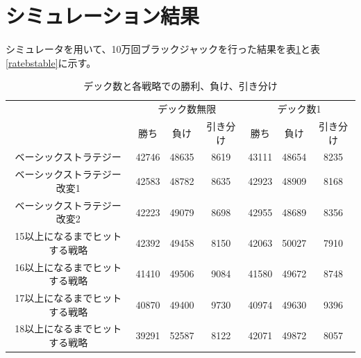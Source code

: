 \section{シミュレーション結果}
シミュレータを用いて、10万回ブラックジャックを行った結果を表\ref{bstable}と表\ref{ratebstable}に示す。
\begin{table}[H]
 \caption{デック数と各戦略での勝利、負け、引き分け\label{bstable}}
 \begin{center}
  \begin{tabular}{|c|c|c|c|c|c|c|}
    \hline & \multicolumn{3}{c|}{デック数無限} & \multicolumn{3}{c|}{デック数1} \\
    \cline{2-7} & 勝ち & 負け & 引き分け & 勝ち & 負け & 引き分け \\
    \hline ベーシックストラテジー & 42746 & 48635 & 8619 & 43111 & 48654 & 8235 \\
    \hline ベーシックストラテジー改変1 & 42583 & 48782 & 8635 & 42923 & 48909 & 8168 \\
    \hline ベーシックストラテジー改変2 & 42223 & 49079 & 8698 & 42955 & 48689 & 8356 \\
    \hline 15以上になるまでヒットする戦略 & 42392 & 49458 & 8150 & 42063 & 50027 & 7910 \\
    \hline 16以上になるまでヒットする戦略 & 41410 & 49506 & 9084 & 41580 & 49672 & 8748 \\
    \hline 17以上になるまでヒットする戦略 & 40870 & 49400 & 9730 & 40974 & 49630 & 9396 \\
    \hline 18以上になるまでヒットする戦略 & 39291 & 52587 & 8122 & 42071 & 49872 & 8057 \\
    \hline
  \end{tabular}
 \end{center}
\end{table}
